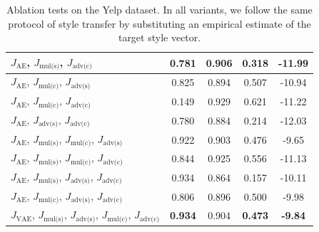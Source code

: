 \documentclass[letterpaper]{article} %
\newcommand{\loss}[1]{J_{\text{#1}}}
\begin{document}
\begin{table}[ht]
\begin{tabular}{| l || c | c | c | c |}
		\hline
		$\loss{AE}$, $\loss{mul(s)}$, $\loss{adv(c)}$                                    & 0.781           & 0.906             & 0.318          & -11.99          \\
		\hline
		$\loss{AE}$, $\loss{mul(c)}$, $\loss{adv(s)}$                                    & 0.825           & 0.894             & 0.507          & -10.94          \\
		\hline
		$\loss{AE}$, $\loss{mul(c)}$, $\loss{adv(c)}$                                    & 0.149           & 0.929             & 0.621          & -11.22          \\
		\hline
		$\loss{AE}$, $\loss{adv(s)}$, $\loss{adv(c)}$                                    & 0.780           & 0.884             & 0.214          & -12.03          \\
		\hline
		$\loss{AE}$, $\loss{mul(s)}$, $\loss{mul(c)}$, $\loss{adv(s)}$                   & 0.922           & 0.903             & 0.476          & -9.65           \\
		\hline
		$\loss{AE}$, $\loss{mul(s)}$, $\loss{mul(c)}$, $\loss{adv(c)}$                   & 0.844           & 0.925             & 0.556          & -11.13          \\
		\hline
		$\loss{AE}$, $\loss{mul(s)}$, $\loss{adv(s)}$, $\loss{adv(c)}$                   & 0.934           & 0.864             & 0.157          & -10.11          \\
		\hline
		$\loss{AE}$, $\loss{mul(c)}$, $\loss{adv(s)}$, $\loss{adv(c)}$                   & 0.806           & 0.896             & 0.500          & -9.98           \\
		\hline
		$\loss{VAE}$, $\loss{mul(s)}$, $\loss{adv(s)}$, $\loss{mul(c)}$, $\loss{adv(c)}$ & \textbf{0.934}  & 0.904             & \textbf{0.473} & \textbf{-9.84}  \\
		\hline
	\end{tabular}\vspace{-.2cm}
	\caption{Ablation tests on the Yelp dataset. In all variants, we follow the same protocol of style transfer by substituting an empirical estimate of the target style vector.}
	\label{tab:ablation-results}
\end{table}
\end{document}
